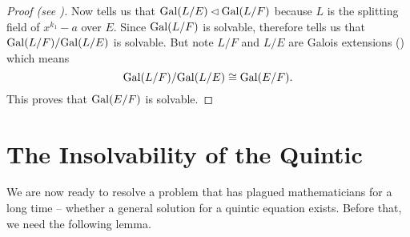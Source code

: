 \begin{proof}[Proof (see {\cite[Theorem 32.5]{gallian_2016}})]
    Now  tells us that $\mathrm{Gal}(L/E) \lhd \mathrm{Gal}(L/F)$ because $L$ is the splitting field of $x^{k_1} - a$ over $E$. Since $\mathrm{Gal}(L/F)$ is solvable, therefore  tells us that $\mathrm{Gal}(L/F)/\mathrm{Gal}(L/E)$ is solvable. But note $L/F$ and $L/E$ are Galois extensions () which means
    \[
        \mathrm{Gal}(L/F)/\mathrm{Gal}(L/E) \cong \mathrm{Gal}(E/F).
    \]
    This proves that $\mathrm{Gal}(E/F)$ is solvable.
\end{proof}


\section{The Insolvability of the Quintic}
We are now ready to resolve a problem that has plagued mathematicians for a long time -- whether a general solution for a quintic equation exists. Before that, we need the following lemma.


